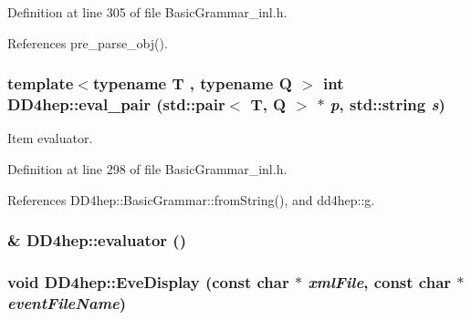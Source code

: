 Definition at line 305 of file BasicGrammar\_\-inl.h.

References pre\_\-parse\_\-obj().\hypertarget{namespace_d_d4hep_aa0b885f854687c0c1d3efe9dced58a23}{
\subsubsection[{eval\_\-pair}]{\setlength{\rightskip}{0pt plus 5cm}template$<$typename T , typename Q $>$ int DD4hep::eval\_\-pair (std::pair$<$ {\bf T}, Q $>$ $\ast$ {\em p}, \/  std::string {\em s})}}
\label{namespace_d_d4hep_aa0b885f854687c0c1d3efe9dced58a23}


Item evaluator. 

Definition at line 298 of file BasicGrammar\_\-inl.h.

References DD4hep::BasicGrammar::fromString(), and dd4hep::g.\hypertarget{namespace_d_d4hep_a5a6983dcc5d95a8aad6910ad842f0b6e}{
\subsubsection[{evaluator}]{ \& DD4hep::evaluator ()}}
\label{namespace_d_d4hep_a5a6983dcc5d95a8aad6910ad842f0b6e}
\hypertarget{namespace_d_d4hep_abf73c406aa34c4fe6bd8af3985bdd888}{
\subsubsection[{EveDisplay}]{\setlength{\rightskip}{0pt plus 5cm}void DD4hep::EveDisplay (const char $\ast$ {\em xmlFile}, \/  const char $\ast$ {\em eventFileName})}}
\label{namespace_d_d4hep_abf73c406aa34c4fe6bd8af3985bdd888}



